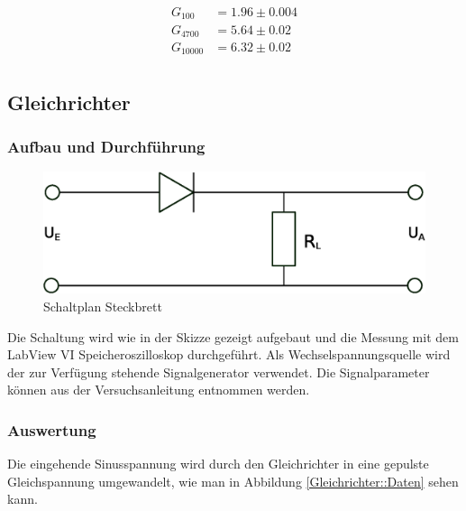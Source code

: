 \documentclass[12pt,twoside,a4paper]{scrartcl}
\begin{document}
				\begin{align*}
					G_{100} &= 1.96 \pm 0.004 \\
					G_{4700} &= 5.64 \pm 0.02 \\
					G_{10000} &= 6.32 \pm 0.02 \\
				\end{align*}

	\subsection{Gleichrichter}

		\subsubsection{Aufbau und Durchführung}

		\begin{figure}[H]
			\centering

			\includegraphics[width = 0.8 \textwidth]{Pictures/rectifier}

			\caption{Schaltplan Steckbrett}
		\end{figure}

			Die Schaltung wird wie in der Skizze gezeigt aufgebaut und die Messung mit dem LabView VI Speicheroszilloskop durchgeführt. Als Wechselspannungsquelle wird der zur Verfügung stehende Signalgenerator verwendet. Die Signalparameter können aus der Versuchsanleitung entnommen werden.

		\subsubsection{Auswertung}

			Die eingehende Sinusspannung wird durch den Gleichrichter in eine gepulste Gleichspannung umgewandelt, wie man in Abbildung \ref{Gleichrichter::Daten} sehen kann.
\end{document}
